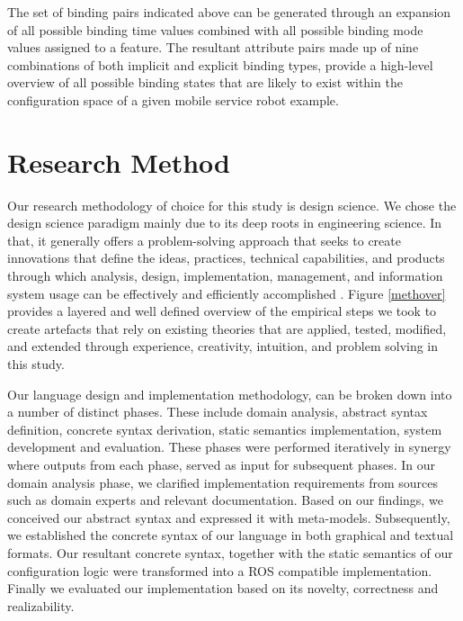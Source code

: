 \documentclass[conference]{IEEEtran}
\begin{document}
The set of binding pairs indicated above can be generated through an expansion of all possible binding time values combined with all possible binding mode values assigned to a feature. The resultant attribute pairs made up of nine combinations of both implicit and explicit binding types, provide a high-level overview of all possible binding states that are likely to exist within the configuration space of a given mobile service robot example. 

\section{Research Method}
Our research methodology of choice for this study is design science. We chose the design science paradigm mainly due to its deep roots in engineering science. In that, it generally offers a problem-solving approach that seeks to create innovations that define the ideas, practices, technical capabilities, and products through which analysis, design, implementation, management, and information system usage can be effectively and efficiently accomplished  \cite{des-res}. Figure \ref{methover} provides a layered and well defined overview of the empirical steps we took to create artefacts that rely on existing theories that are applied, tested, modified, and extended through experience, creativity, intuition, and problem solving in this study.

Our language design and implementation methodology, can be broken down into a number of distinct phases. These include domain analysis, abstract syntax definition, concrete syntax derivation, static semantics implementation, system development and evaluation. These phases were performed iteratively in synergy where outputs from each phase, served as input for subsequent phases. In our domain analysis phase, we clarified implementation requirements from sources such as domain experts and relevant documentation. Based on our findings, we conceived our abstract syntax and expressed it with meta-models. Subsequently, we established the concrete syntax of our language in both graphical and textual formats. Our resultant concrete syntax, together with the static semantics of our configuration logic were transformed into a ROS compatible implementation. Finally we evaluated our implementation based on its novelty, correctness and realizability.
\end{document}
